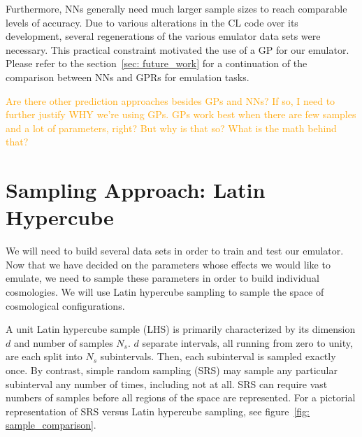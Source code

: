 Furthermore, NNs generally need much larger sample sizes to reach comparable 
levels of accuracy. Due to various alterations in the CL code 
over its development, several regenerations of the various emulator data sets 
were necessary. This practical constraint motivated the use of a GP for our
emulator. Please refer to the section~\ref{sec: future_work} for a
continuation of the comparison between NNs and GPRs for emulation tasks.

\textcolor{orange}{Are there other prediction approaches besides GPs and NNs? 
If so, I need to further justify WHY we’re using GPs.
GPs work best when there are few samples and a lot of 
parameters, right? But why is that so? What is the math behind that?}


\section{Sampling Approach: Latin Hypercube}
\label{sec: lhc_theory}

\begin{comment}
The computational complexity of inference and likelihood evaluation within GPR 
is cubic in the number of points \cbib{Barber}.
This makes GP regression an excellent companion to
Latin hypercube sampling (LHS), which makes highly efficient use of a limited 
number of samples.
\end{comment}

We will need to build several data sets in order to train and test our
emulator. Now that we have decided on the parameters whose effects we would
like to emulate, we need to sample these parameters in order to build
individual cosmologies. We will use Latin hypercube sampling to sample 
the space of cosmological configurations.

A unit Latin hypercube sample (LHS) is primarily characterized by its 
dimension $d$ and number of 
samples $N_s$. $d$ separate intervals, all running from zero to unity, are
each split into $N_s$ subintervals. Then, each subinterval is sampled
exactly once. By contrast, simple random sampling (SRS) may sample any 
particular subinterval any number of times, including not at all. SRS
can require vast numbers of samples before all regions of the space are
represented. For a pictorial representation of SRS versus Latin hypercube
sampling, see figure~\ref{fig: sample_comparison}.

